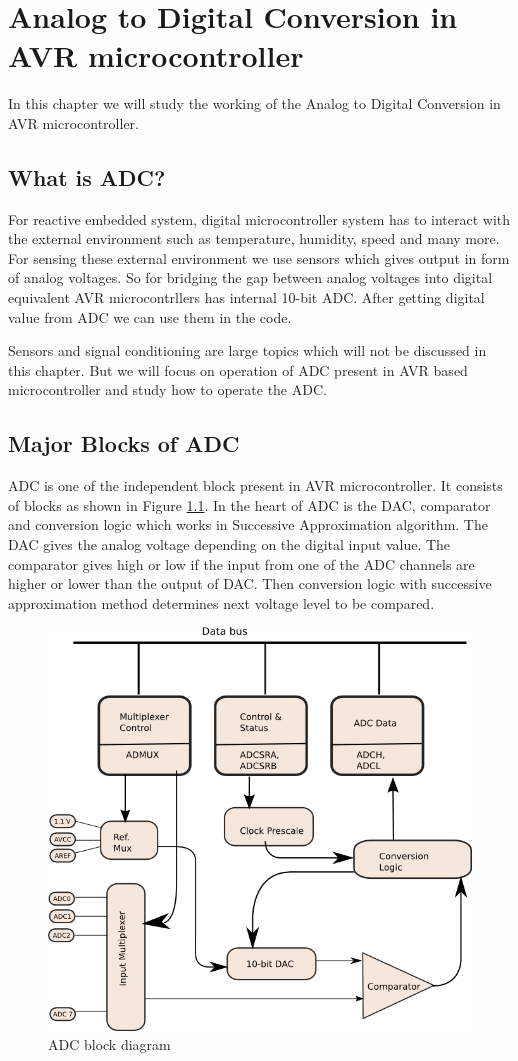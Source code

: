 \chapter[ADC on AVR based microcontroller]{Analog to Digital Conversion in AVR microcontroller}
In this chapter we will study the working of the Analog to Digital Conversion in AVR microcontroller.
\section{What is ADC?}
For reactive embedded system, digital microcontroller system has to interact with the external environment such as temperature, humidity, speed and many more. For sensing these external environment we use sensors which gives output in form of analog voltages. So for bridging the gap between analog voltages into digital equivalent AVR microcontrllers has internal 10-bit ADC.
After getting digital value from ADC we can use them in the code.

Sensors and signal conditioning are large topics which will not be discussed in this chapter. But we will focus on operation of ADC present in AVR based microcontroller and study how to operate the ADC.
\section{Major Blocks of ADC}
ADC is one of the independent block present in AVR microcontroller. It consists of blocks as shown in Figure \ref{fig:ADC}. 
In the heart of ADC is the DAC, comparator and conversion logic which works in Successive Approximation algorithm. The DAC gives the analog voltage depending on the digital input value. The comparator gives high or low if the input from one of the ADC channels are higher or lower than the output of DAC. Then conversion logic with successive approximation method determines next voltage level to be compared. 
\begin{figure}
\centering
\includegraphics[width=\textwidth,keepaspectratio]{adc_blocks}
\caption{ADC block diagram}
\label{fig:ADC}
\end{figure}


